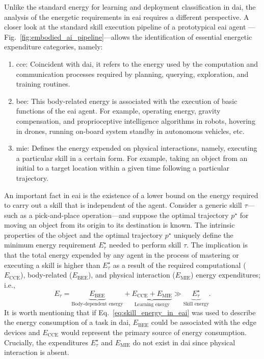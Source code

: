 \documentclass[12pt]{article}
\begin{document}
Unlike the standard energy for learning and deployment classification in \ac{dai}, the analysis of the energetic requirements in \ac{eai} requires a different perspective. A closer look at the standard skill execution pipeline of a prototypical \ac{eai} agent ---Fig.~\ref{fig:embodied_ai_pipeline}---allows the identification of essential energetic expenditure categories, namely:
\begin{enumerate}
	\item \Ac{cce}: Coincident with \ac{dai}, it refers to the energy used by the computation and communication processes required by planning, querying, exploration, and training routines.
	\item \Ac{bee}: This body-related energy is associated with the execution of basic functions of the \ac{eai} agent. For example, operating energy, gravity compensation, and proprioceptive intelligence algorithms in robots, hovering in drones, running on-board system standby in autonomous vehicles, etc.
	\item \Ac{mie}: Defines the energy expended on physical interactions, namely, executing a particular skill in a certain form. For example, taking an object from an initial to a target location within a given time following a particular trajectory.
\end{enumerate}

An important fact in \ac{eai} is the existence of a lower bound on the energy required to carry out a skill that is independent of the agent. Consider a generic skill $\tau$---such as a pick-and-place operation---and suppose the optimal trajectory $p^\star$ for moving an object from its origin to its destination is known. The intrinsic properties of the object and the optimal trajectory $p^\star$ uniquely define the minimum energy requirement $E^\star_{\tau}$ needed to perform skill $\tau$. The implication is that the total energy expended by any agent in the process of mastering or executing a skill is higher than $E^\star_{\tau}$ as a result of the required computational ($E_\text{CCE}$), body-related ($E_\text{BEE}$), and physical interaction ($E_\text{MIE}$) energy expenditures; i.e.,
\begin{equation}\label{eq:skill_energy_in_eai}
	E_{\tau} =  \underbrace{E_\text{BEE}}_{\text{Body-dependent energy}} + \underbrace{E_\text{CCE} + E_\text{MIE}}_{\text{Learning energy}} \gg \underbrace{E^\star_{\tau}}_{\text{Skill energy}} .
\end{equation}
It is worth mentioning that if Eq.~\eqref{eq:skill_energy_in_eai} was used to describe the energy consumption of a task in \ac{dai}, $E_\text{BEE}$ could be associated with the edge devices and $E_\text{CCE}$ would represent the primary source of energy consumption. Crucially, the expenditures $E^\star_{\tau}$ and $E_\text{MIE}$ do not exist in \ac{dai} since physical interaction is absent.
\end{document}
